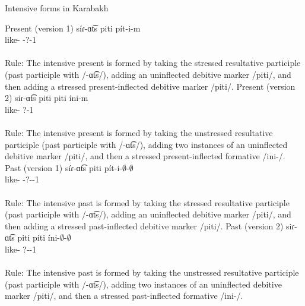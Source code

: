 \begin{exe}
	\ex Intensive forms in Karabakh \label{sent:Karabakh:morpho:verb:intensive}
	\begin{xlist}
		\ex Present (version 1) \gll 
		s\'iɾ-ɑt͡s piti p\'it-i-m \\ 
		like-{\rptcp} {\deb} {\deb}-?-1{\sg} \\ 
		\trans {}\\
		Rule: The intensive present is formed by taking the stressed resultative participle (past participle with /-ɑt͡s/), adding an uninflected debitive marker /piti/, and then adding a stressed present-inflected debitive marker /piti/. 
		\ex Present (version 2) \gll 
		siɾ-ɑt͡s piti piti \'ini-m \\ 
		like-{\rptcp} {\deb} {\deb} {?}-1{\sg} \\ 
		\trans {}\\
		Rule: The intensive present is formed by taking the unstressed resultative participle (past participle with /-ɑt͡s/), adding two instances of an uninflected debitive marker /piti/, and then a stressed present-inflected formative /ini-/.
		\ex Past (version 1) \gll 
		s\'iɾ-ɑt͡s piti p\'it-i-$\emptyset$-$\emptyset$ \\ 
		like-{\rptcp} {\deb} {\deb}-?-{\pst}-1{\sg} \\ 
		\trans {}\\
		Rule: The intensive past is formed by taking the stressed resultative participle (past participle with /-ɑt͡s/), adding an uninflected debitive marker /piti/, and then adding a stressed past-inflected debitive marker /piti/. 
		\ex Past (version 2) \gll 
		siɾ-ɑt͡s piti piti \'ini-$\emptyset$-$\emptyset$ \\ 
		like-{\rptcp} {\deb} {\deb} {?}-{\pst}-1{\sg} \\ 
		\trans {} \\
		Rule: The intensive past is formed by taking the unstressed resultative participle (past participle with /-ɑt͡s/), adding two instances of an uninflected debitive marker /piti/, and then a stressed past-inflected formative /ini-/.
		

\end{xlist}
\end{exe}
